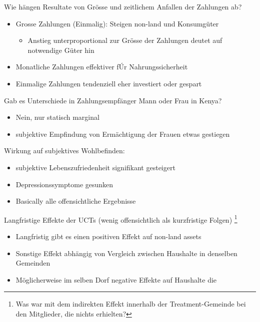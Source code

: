 Wie hängen Resultate von Grösse und zeitlichem Anfallen der Zahlungen ab?

\begin{itemize}
    \item Grosse Zahlungen (Einmalig): Steigen non-land und Konsumgüter
    \begin{itemize}
        \item Anstieg unterproportional zur Grösse der Zahlungen deutet auf notwendige Güter hin
    \end{itemize}
    \item Monatliche Zahlungen effektiver fÚr Nahrungssicherheit
    \item Einmalige Zahlungen tendenziell eher investiert oder gespart 
\end{itemize}

Gab es Unterschiede in Zahlungsempfänger Mann oder Frau in Kenya?

\begin{itemize}
    \item Nein, nur statisch marginal
    \item subjektive Empfindung von Ermächtigung der Frauen etwas gestiegen
\end{itemize}

Wirkung auf subjektives Wohlbefinden:
\begin{itemize}
    \item subjektive Lebenszufriedenheit signifikant gesteigert
    \item Depressionssymptome gesunken 
    \item Basically alle offensichtliche Ergebnisse
\end{itemize}

Langfristige Effekte der UCTs (wenig offensichtlich als kurzfristige Folgen) \footnote{Was war mit dem indirekten Effekt innerhalb der Treatment-Gemeinde bei den Mitglieder, die nichts erhielten?}
\begin{itemize}
    \item Langfristig gibt es einen positiven Effekt auf non-land assets
    \item Sonstige Effekt abhängig von Vergleich zwischen Haushalte in denselben Gemeinden
    \item Möglicherweise im selben Dorf negative Effekte auf Haushalte die 
\end{itemize}
